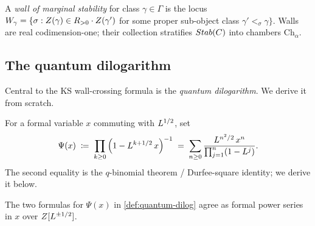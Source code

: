 \begin{definition}
  \label{def:chamber-boundary}
  A \emph{wall of marginal stability} for class $\gamma \in \Gamma$ is the locus
  $W_\gamma = \{\sigma : Z(\gamma) \in R_{>0} \cdot Z(\gamma')$ for some
  proper sub-object class $\gamma' <_\sigma \gamma\}$. Walls are real
  codimension-one; their collection stratifies $Stab(C)$ into chambers
  $\mathrm{Ch}_\alpha$.
\end{definition}

\subsection{The quantum dilogarithm}

Central to the KS wall-crossing formula is the \emph{quantum
dilogarithm}. We derive it from scratch.

\begin{definition}
  \label{def:quantum-dilog}
  For a formal variable $x$ commuting with $L^{1/2}$, set
  \[
    \Psi(x) \;\coloneqq\; \prod_{k \geq 0} \Big(1 - L^{k + 1/2}\, x\Big)^{-1}
            \;=\; \sum_{n \geq 0} \frac{L^{n^2/2}\, x^n}{\prod_{j=1}^n (1 - L^j)}.
  \]
  The second equality is the $q$-binomial theorem / Durfee-square
  identity; we derive it below.
\end{definition}

\begin{proposition}
  \label{prop:psi-durfee-square}
  The two formulas for $\Psi(x)$ in \cref{def:quantum-dilog} agree as
  formal power series in $x$ over $Z[L^{\pm 1/2}]$.
\end{proposition}

